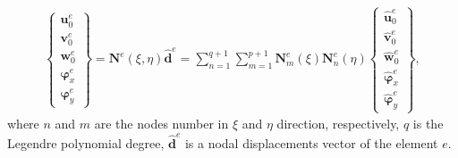 \begin{eqnarray}
	\left \{\begin{array}{c}
		\textbf{u}_0^e\\
		\textbf{v}_0^e\\
		\textbf{w}_0^e\\
		\boldsymbol{\varphi}_x^e\\
		\boldsymbol{\varphi}_y^e
	\end{array} \right\}
	= \textbf{N}^e(\xi,\eta)\widehat{\textbf{d}}^e
	= \sum_{n=1}^{q+1}\sum_{m=1}^{p+1}\textbf{N}_m^e(\xi)\textbf{N}_n^e(\eta)
	\left \{ \begin{array}{c}
		\widehat{\textbf{u}}_0^e \\
		\widehat{\textbf{v}}_0^e \\
		\widehat{\textbf{w}}_0^e \\
		\widehat{\boldsymbol{\varphi}}_x^e \\
		\widehat{\boldsymbol{\varphi}}_y^e
	\end{array} \right \},
\end{eqnarray}
where \(n\) and \(m\) are the nodes number in \(\xi\) and \(\eta\) direction, respectively, \(q\) is the Legendre polynomial degree,  $\widehat{\textbf{d}}^e$ is a nodal displacements vector of the element $e$.

